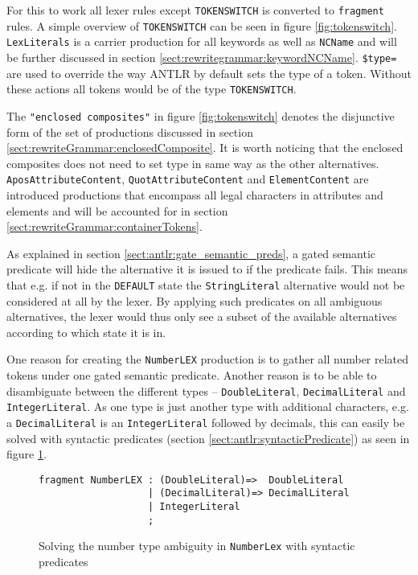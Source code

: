 For this to work all lexer rules except \verb!TOKENSWITCH! is converted to \verb!fragment! rules. A simple overview of \verb!TOKENSWITCH! can be seen in figure \ref{fig:tokenswitch}. \verb!LexLiterals! is a carrier production for all keywords as well as \verb!NCName! and will be further discussed in section \ref{sect:rewritegrammar:keywordNCName}. \verb!$type=! are used to override the way ANTLR by default sets the type of a token. Without these actions all tokens would be of the type \verb!TOKENSWITCH!.

The \verb!"enclosed composites"! in figure \ref{fig:tokenswitch} denotes the
disjunctive form of the set of productions discussed in section \ref{sect:rewriteGrammar:enclosedComposite}. It is worth noticing that the enclosed composites does not need to set type in same way as the other alternatives. \verb!AposAttributeContent!, \verb!QuotAttributeContent! and \verb!ElementContent! are introduced productions that encompass all legal characters in attributes and elements and will be accounted for in section \ref{sect:rewriteGrammar:containerTokens}.

As explained in section \ref{sect:antlr:gate_semantic_preds}, a gated semantic predicate will hide the alternative it is issued to if the predicate fails. This means that e.g. if not in the \verb!DEFAULT! state the \verb!StringLiteral! alternative would not be considered at all by the lexer. By applying such predicates on all ambiguous alternatives, the lexer would thus only see a subset of the available alternatives according to which state it is in.

One reason for creating the \verb!NumberLEX! production is to gather all number related tokens under one gated semantic predicate. Another reason is to be able to disambiguate between the different types -- \verb!DoubleLiteral!, \verb!DecimalLiteral! and \verb!IntegerLiteral!. As one type is just another type with additional characters, e.g. a \verb!DecimalLiteral! is an \verb!IntegerLiteral! followed by decimals, this can easily be solved with syntactic predicates (section \ref{sect:antlr:syntacticPredicate}) as seen in figure \ref{fig:numberLex}.

\begin{figure}[h!]
\begin{Verbatim}
fragment NumberLEX : (DoubleLiteral)=>	DoubleLiteral
                   | (DecimalLiteral)=> DecimalLiteral
                   | IntegerLiteral
                   ;
\end{Verbatim}
\caption[Solving the number type ambiguity]{Solving the number type ambiguity in \texttt{NumberLex} with syntactic predicates}
\label{fig:numberLex}
\end{figure}

